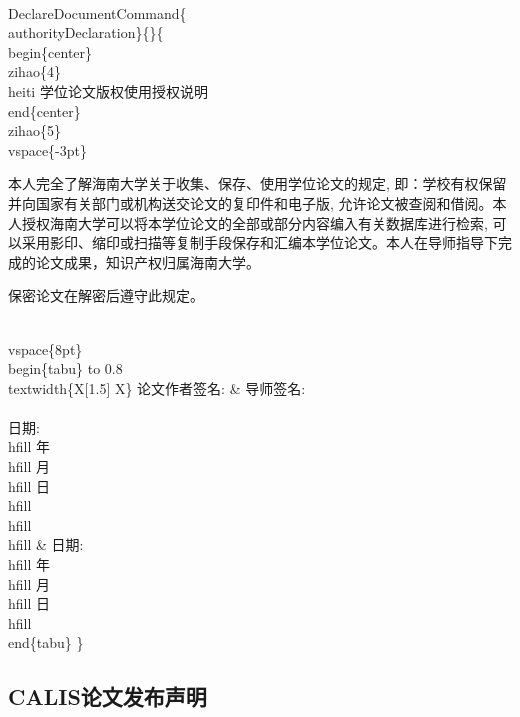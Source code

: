 \documentclass{hnuthesis}%
\begin{document}
\begin{nowebtrunk}
\nwenddocs{}\endmoddef\nwstartdeflinemarkup{}\nwenddeflinemarkup
\\DeclareDocumentCommand\{\\authorityDeclaration\}\{\}\{
    \\begin\{center\}\\zihao\{4\}\\heiti 学位论文版权使用授权说明\\end\{center\}
        \\zihao\{5\}\\vspace\{-3pt\}

本人完全了解海南大学关于收集、保存、使用学位论文的规定, 即：学校有权保留并向国家有关部门或机构送交论文的复印件和电子版, 允许论文被查阅和借阅。本人授权海南大学可以将本学位论文的全部或部分内容编入有关数据库进行检索, 可以采用影印、缩印或扫描等复制手段保存和汇编本学位论文。本人在导师指导下完成的论文成果，知识产权归属海南大学。

保密论文在解密后遵守此规定。

    \\vspace\{8pt\}
\\begin\{tabu\} to 0.8\\textwidth\{X[1.5] X\}
论文作者签名: &  导师签名: \\\\
日期:\\hfill 年 \\hfill 月\\hfill 日\\hfill\\hfill\\hfill  & 
日期:\\hfill 年 \\hfill 月\\hfill 日\\hfill
\\end\{tabu\}
\}
\nwendcode{}\end{nowebtrunk}


\subsection{CALIS论文发布声明}
\end{document}
